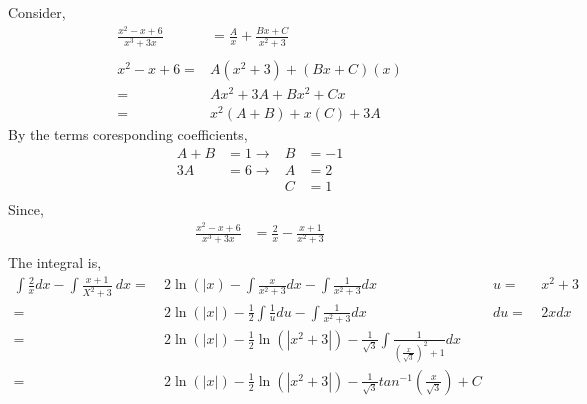 \documentclass[10pt,letterpaper,cm]{hmcpset}
\begin{document}
Consider,\\
\begin{align*}
  \frac{x^2 - x + 6}{x^3+3x} &= \frac{A}{x} + \frac{Bx+C}{x^2+3}\\
  \\x^2-x+6=&A(x^2+3)+(Bx+C)(x)\\
           =&Ax^2+3A+Bx^2+Cx\\
           =&x^2(A+B)+x(C) + 3A
\end{align*}
By the terms coresponding coefficients,
\begin{align*}
          A+B &= 1 \rightarrow& B&=-1\\
          3A  &=6 \rightarrow& A&=2\\  
           && C &=1\\
\end{align*}
Since,
\begin{align*}
  \frac{x^2 - x + 6}{x^3+3x} &= \frac{2}{x} - \frac{x+1}{x^2+3}\\
\end{align*}
The integral is,
\begin{align*}
  \int\frac{2}{x}dx - \int\frac{x+1}{X^2+3}~dx =&~2\ln(|x) - \int\frac{x}{x^2+3}dx
  - \int\frac{1}{x^2+3}dx &u=&~x^2+3 \\
  =&~2\ln\left( |x| \right)-\frac{1}{2}\int\frac{1}{u}du
  - \int\frac{1}{x^2+3}dx &du=&~2xdx \\
  =&~2\ln\left( |x| \right)-\frac{1}{2} \ln(|x^2+3|)
  - \frac{1}{\sqrt{3}}\int\frac{1}{\left( \frac{x}{\sqrt{3}} \right)^2+1} dx \\
  =&~2\ln\left( |x| \right)-\frac{1}{2} \ln(|x^2+3|)
  - \frac{1}{\sqrt{3}}tan^{-1}\left( \frac{x}{\sqrt{3}}\right) + C \\
\end{align*}
\end{document}
